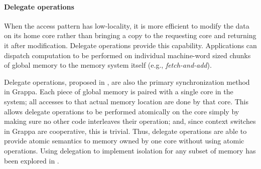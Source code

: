 \paragraph{Delegate operations}
When the access pattern has low-locality, it is more efficient
to modify the data on its home core rather than bringing a copy to the
requesting core and returning it after modification. Delegate
operations provide this capability. Applications can dispatch
computation to be performed on individual machine-word sized chunks of
global memory to the memory system itself (e.g.,
\emph{fetch-and-add}). 

Delegate operations, proposed in \cite{Nelson:hotpar11}, are also the
primary synchronization method in Grappa. Each piece of global memory is
paired with a single core in the system; all accesses to that actual
memory location are done by that core. This allows delegate operations
to be performed atomically on the core simply by making sure no other
code interleaves their operation; and, since context switches in Grappa
are cooperative, this is trivial. Thus, delegate operations are able to
provide atomic semantics to memory owned by one core without using
atomic operations. Using delegation to implement isolation for any
subset of memory has been explored in \cite{delegated:oopsla11}.

